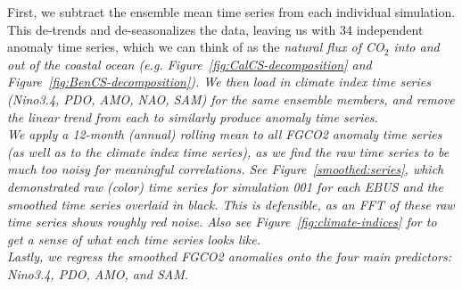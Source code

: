 \documentclass[12pt]{article}
\begin{document}
First, we subtract the ensemble mean time series from each individual simulation. This de-trends and de-seasonalizes the data, leaving us with 34 independent anomaly time series, which we can think of as the \it natural \rm flux of CO$_{2}$ into and out of the coastal ocean (e.g. Figure~\ref{fig:CalCS-decomposition} and Figure~\ref{fig:BenCS-decomposition}). We then load in climate index time series (Nino3.4, PDO, AMO, NAO, SAM) for the same ensemble members, and remove the linear trend from each to similarly produce anomaly time series. \\


We apply a 12-month (annual) rolling mean to all FGCO2 anomaly time series (as well as to the climate index time series), as we find the raw time series to be much too noisy for meaningful correlations. See Figure~\ref{smoothed:series}, which demonstrated raw (color) time series for simulation 001 for each EBUS and the smoothed time series overlaid in black. This is defensible, as an FFT of these raw time series shows roughly red noise. Also see Figure~\ref{fig:climate-indices} for to get a sense of what each time series looks like. \\

Lastly, we regress the smoothed FGCO2 anomalies onto the four main predictors: Nino3.4, PDO, AMO, and SAM. 
\end{document}
